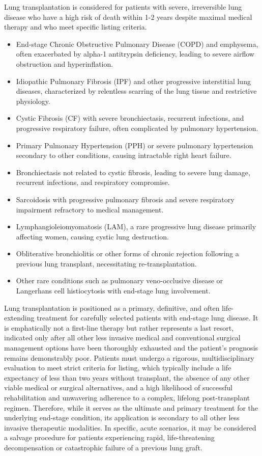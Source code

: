 Lung transplantation is considered for patients with severe, irreversible lung disease who have a high risk of death within 1-2 years despite maximal medical therapy and who meet specific listing criteria.

\begin{itemize}
  \item End-stage Chronic Obstructive Pulmonary Disease (COPD) and emphysema, often exacerbated by alpha-1 antitrypsin deficiency, leading to severe airflow obstruction and hyperinflation.
  \item Idiopathic Pulmonary Fibrosis (IPF) and other progressive interstitial lung diseases, characterized by relentless scarring of the lung tissue and restrictive physiology.
  \item Cystic Fibrosis (CF) with severe bronchiectasis, recurrent infections, and progressive respiratory failure, often complicated by pulmonary hypertension.
  \item Primary Pulmonary Hypertension (PPH) or severe pulmonary hypertension secondary to other conditions, causing intractable right heart failure.
  \item Bronchiectasis not related to cystic fibrosis, leading to severe lung damage, recurrent infections, and respiratory compromise.
  \item Sarcoidosis with progressive pulmonary fibrosis and severe respiratory impairment refractory to medical management.
  \item Lymphangioleiomyomatosis (LAM), a rare progressive lung disease primarily affecting women, causing cystic lung destruction.
  \item Obliterative bronchiolitis or other forms of chronic rejection following a previous lung transplant, necessitating re-transplantation.
  \item Other rare conditions such as pulmonary veno-occlusive disease or Langerhans cell histiocytosis with end-stage lung involvement.
\end{itemize}

Lung transplantation is positioned as a primary, definitive, and often life-extending treatment for carefully selected patients with end-stage lung disease. It is emphatically not a first-line therapy but rather represents a last resort, indicated only after all other less invasive medical and conventional surgical management options have been thoroughly exhausted and the patient's prognosis remains demonstrably poor. Patients must undergo a rigorous, multidisciplinary evaluation to meet strict criteria for listing, which typically include a life expectancy of less than two years without transplant, the absence of any other viable medical or surgical alternatives, and a high likelihood of successful rehabilitation and unwavering adherence to a complex, lifelong post-transplant regimen. Therefore, while it serves as the ultimate and primary treatment for the underlying end-stage condition, its application is secondary to all other less invasive therapeutic modalities. In specific, acute scenarios, it may be considered a salvage procedure for patients experiencing rapid, life-threatening decompensation or catastrophic failure of a previous lung graft.

